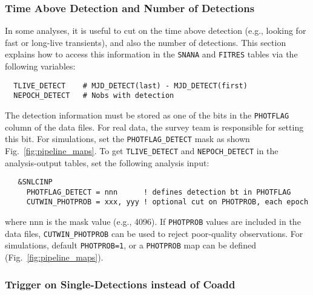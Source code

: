 \documentclass[12pt]{article}
\begin{document}
{%
   \clearpage
   \subsubsection{Time Above Detection and Number of Detections}
   \label{sssec:detect_var}

In some analyses, it is useful to cut on the time above detection
(e.g., looking for fast or long-live transients), and also the
number of detections. This section explains how to access this
information in the {\tt SNANA} and {\tt FITRES} tables via
the following variables:
%
\begin{verbatim}
  TLIVE_DETECT    # MJD_DETECT(last) - MJD_DETECT(first)
  NEPOCH_DETECT   # Nobs with detection
\end{verbatim}
%
The detection information must be stored as one of the bits in the
{\tt PHOTFLAG} column of the data files. For real data, the survey
team is responsible for setting this bit. For simulations, set the
{\tt PHOTFLAG\_DETECT} mask as shown Fig.~\ref{fig:pipeline_maps}.
To get {\tt TLIVE\_DETECT} and {\tt NEPOCH\_DETECT} in the
analysis-output tables, set the following analysis input:
\begin{verbatim}                                                               
   &SNLCINP
     PHOTFLAG_DETECT = nnn      ! defines detection bt in PHOTFLAG
     CUTWIN_PHOTPROB = xxx, yyy ! optional cut on PHOTPROB, each epoch
\end{verbatim}                                                                
%
where nnn is the mask value (e.g., 4096).
If {\tt PHOTPROB} values are included in the data files,
{\tt CUTWIN\_PHOTPROB} can be used to reject poor-quality 
observations. For simulations, default {\tt PHOTPROB=1},
or a {\tt PHOTPROB} map can be defined (Fig.~\ref{fig:pipeline_maps}).

   \subsubsection{Trigger on Single-Detections instead of Coadd}
   \label{sssec:detect_single}

}
\end{document}
